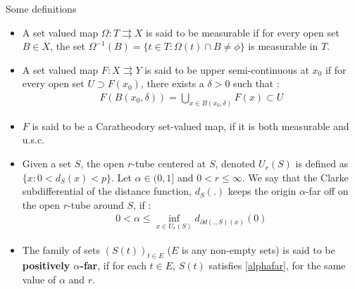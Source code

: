 \documentclass[8pt,aspectratio=169]{beamer}
\begin{document}
\begin{frame}{Some definitions}
    \begin{itemize}
        \item A set valued map $\Omega : T \rightrightarrows X$ is said to be measurable if for every open set $B \in X$, the set $\Omega^{-1}(B) = \{t\in T : \Omega(t) \cap B \neq \phi\}$ is measurable in $T$.
        \item A set valued map $F : X \rightrightarrows Y$ is said to be upper semi-continuous at $x_0$ if for every open set $U \supset F(x_0)$, there exists a $\delta > 0$ such that :
        \begin{align*}
            F(B(x_0, \delta)) = \bigcup_{x\in B(x_0, \delta)} F(x) \subset U
        \end{align*}
        \item $F$ is said to be a Caratheodory set-valued map, if it is both measurable and u.s.c.
        \item Given a set $S$, the open $r$-tube centered at $S$, denoted $U_r(S)$ is defined as $\{x: 0 < d_S(x) < p\}$. Let $\alpha \in (0, 1]$ and $0 < r\leq \infty$. We say that the Clarke subdifferential of the distance function, $d_S(.)$ keeps the origin $\alpha$-far off on the open $r$-tube around $S$, if :
        \begin{align}\label{alphafar}
            0 < \alpha \leq \inf_{x \in U_r(S)} d_{\partial d(., S)(x)}(0)
        \end{align}
        \item The family of sets $(S(t))_{t\in E}$ ($E$ is any non-empty sets) is said to be \textbf{positively $\alpha$-far}, if for each $t\in E$, $S(t)$ satisfies \ref{alphafar}, for the same value of $\alpha$ and $r$.
    \end{itemize}    
\end{frame}
\end{document}
